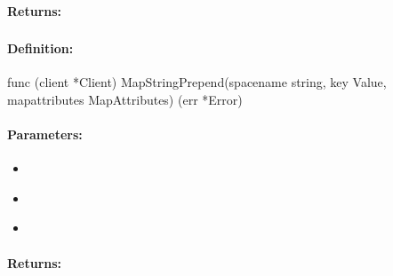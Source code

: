 \paragraph{Returns:}


\pagebreak
\subsubsection{}
\label{api:Go:MapStringPrepend}


\paragraph{Definition:}
\begin{gocode}
func (client *Client) MapStringPrepend(spacename string, key Value, mapattributes MapAttributes) (err *Error)
\end{gocode}

\paragraph{Parameters:}
\begin{itemize}[noitemsep]
\item {}\\

\item {}\\

\item {}\\

\end{itemize}

\paragraph{Returns:}


\pagebreak
\subsubsection{}
\label{api:Go:CondMapStringPrepend}



